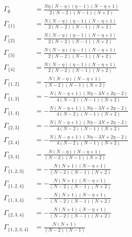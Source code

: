 \documentclass[11pt]{article}
\begin{document}
\begin{align*}
  \Gamma_{\emptyset} &= \frac{N \eta \left(N - \eta\right) \left(\eta - 1\right) \left(N - \eta + 1\right)}{2 \left(N - 2\right) \left(N - 1\right) \left(N + 2\right)} \\
  \Gamma_{\{1\}} &= \frac{N \left(N - \eta\right) \left(\eta - 1\right) \left(N - \eta + 1\right)}{2 \left(N - 2\right) \left(N - 1\right) \left(N + 2\right)} \\
  \Gamma_{\{2\}} &= \frac{N \left(N - \eta\right) \left(\eta - 1\right) \left(N - \eta + 1\right)}{2 \left(N - 2\right) \left(N - 1\right) \left(N + 2\right)} \\
  \Gamma_{\{3\}} &= \frac{N \left(N - \eta\right) \left(\eta - 1\right) \left(N - \eta + 1\right)}{2 \left(N - 2\right) \left(N - 1\right) \left(N + 2\right)} \\
  \Gamma_{\{4\}} &= \frac{N \left(N - \eta\right) \left(\eta - 1\right) \left(N - \eta + 1\right)}{2 \left(N - 2\right) \left(N - 1\right) \left(N + 2\right)} \\
  \Gamma_{\{1,2\}} &= \frac{N \left(N - \eta\right) \left(N - \eta + 1\right)}{\left(N - 2\right) \left(N - 1\right) \left(N + 2\right)} \\
  \Gamma_{\{1,3\}} &= - \frac{N \left(N - \eta + 1\right) \left(N \eta - 3 N + 2 \eta - 2\right)}{4 \left(N - 2\right) \left(N - 1\right) \left(N + 2\right)} \\
  \Gamma_{\{1,4\}} &= - \frac{N \left(N - \eta + 1\right) \left(N \eta - 3 N + 2 \eta - 2\right)}{4 \left(N - 2\right) \left(N - 1\right) \left(N + 2\right)} \\
  \Gamma_{\{2,3\}} &= - \frac{N \left(N - \eta + 1\right) \left(N \eta - 3 N + 2 \eta - 2\right)}{4 \left(N - 2\right) \left(N - 1\right) \left(N + 2\right)} \\
  \Gamma_{\{2,4\}} &= - \frac{N \left(N - \eta + 1\right) \left(N \eta - 3 N + 2 \eta - 2\right)}{4 \left(N - 2\right) \left(N - 1\right) \left(N + 2\right)} \\
  \Gamma_{\{3,4\}} &= \frac{N \left(N - \eta\right) \left(N - \eta + 1\right)}{\left(N - 2\right) \left(N - 1\right) \left(N + 2\right)} \\
  \Gamma_{\{1,2,3\}} &= - \frac{N \left(N + 1\right) \left(N - \eta + 1\right)}{\left(N - 2\right) \left(N - 1\right) \left(N + 2\right)} \\
  \Gamma_{\{1,2,4\}} &= - \frac{N \left(N + 1\right) \left(N - \eta + 1\right)}{\left(N - 2\right) \left(N - 1\right) \left(N + 2\right)} \\
  \Gamma_{\{1,3,4\}} &= - \frac{N \left(N + 1\right) \left(N - \eta + 1\right)}{\left(N - 2\right) \left(N - 1\right) \left(N + 2\right)} \\
  \Gamma_{\{2,3,4\}} &= - \frac{N \left(N + 1\right) \left(N - \eta + 1\right)}{\left(N - 2\right) \left(N - 1\right) \left(N + 2\right)} \\
  \Gamma_{\{1,2,3,4\}} &= \frac{N \left(N + 1\right)}{\left(N - 2\right) \left(N - 1\right)} 
\end{align*}
\end{document}
